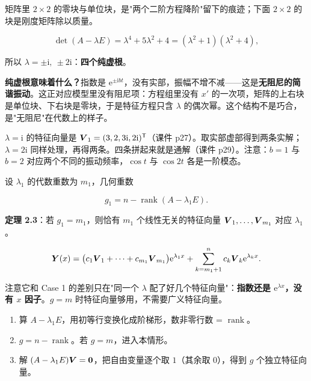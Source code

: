 \documentclass[11pt]{ctexart}
\newcommand{\rank}{\operatorname{rank}}
\begin{document}
矩阵里 $2\times2$ 的零块与单位块，是"两个二阶方程降阶"留下的痕迹；下面 $2\times2$ 的块是刚度矩阵除以质量。



\[
\det(A-\lambda E)=\lambda^4+5\lambda^2+4=(\lambda^2+1)(\lambda^2+4),
\]

所以 $\lambda=\pm\mathrm{i},\ \pm2\mathrm{i}$：\textbf{四个纯虚根}。

\textbf{纯虚根意味着什么？}指数是 $\mathrm{e}^{\pm\mathrm{i}bt}$，没有实部，振幅不增不减——这是\textbf{无阻尼的简谐振动}。这正对应模型里没有阻尼项：方程组里没有 $x'$ 的一次项，矩阵的上右块是单位块、下右块是零块，于是特征方程只含 $\lambda$ 的偶次幂。这个结构不是巧合，是"无阻尼"在代数上的样子。


$\lambda=\mathrm{i}$ 的特征向量是 $\boldsymbol{V}_1=(3,2,3\mathrm{i},2\mathrm{i})^{\mathsf T}$（课件 p27）。取实部虚部得到两条实解；$\lambda=2\mathrm{i}$ 同样处理，再得两条。四条拼起来就是通解（课件 p29）。注意：$b=1$ 与 $b=2$ 对应两个不同的振动频率，$\cos t$ 与 $\cos2t$ 各是一阶模态。



设 $\lambda_1$ 的代数重数为 $m_1$，几何重数

\[
g_1=n-\rank(A-\lambda_1E).
\]

\textbf{定理 2.3}：若 $g_1=m_1$，则恰有 $m_1$ 个线性无关的特征向量 $\boldsymbol{V}_1,\dots,\boldsymbol{V}_{m_1}$ 对应 $\lambda_1$。


\[
\boldsymbol{Y}(x)=\bigl(c_1\boldsymbol{V}_1+\cdots+c_{m_1}\boldsymbol{V}_{m_1}\bigr)\mathrm{e}^{\lambda_1x}
+\sum_{k=m_1+1}^{n}c_k\boldsymbol{V}_k\mathrm{e}^{\lambda_kx}.
\]

注意它和 Case 1 的差别只在"同一个 $\lambda$ 配了好几个特征向量"：\textbf{指数还是 $\mathrm{e}^{\lambda x}$，没有 $x$ 因子}。$g=m$ 时特征向量够用，不需要广义特征向量。


\begin{enumerate}
  \item 算 $A-\lambda_1E$，用初等行变换化成阶梯形，数非零行数 = $\rank$。
  \item $g=n-\rank$。若 $g=m$，进入本情形。
  \item 解 $(A-\lambda_1E)\boldsymbol{V}=\boldsymbol{0}$，把自由变量逐个取 $1$（其余取 $0$），得到 $g$ 个独立特征向量。
\end{enumerate}
\end{document}
